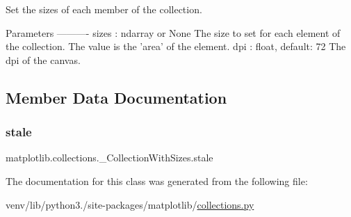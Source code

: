\begin{DoxyVerb}Set the sizes of each member of the collection.

Parameters
----------
sizes : ndarray or None
    The size to set for each element of the collection.  The
    value is the 'area' of the element.
dpi : float, default: 72
    The dpi of the canvas.
\end{DoxyVerb}
 

\subsection{Member Data Documentation}
\mbox{\label{classmatplotlib_1_1collections_1_1__CollectionWithSizes_acf59e05783a5ebb605d18256e92bb4f5}} 
\subsubsection{\texorpdfstring{stale}{stale}}
{\footnotesize\ttfamily matplotlib.\+collections.\+\_\+\+Collection\+With\+Sizes.\+stale}



The documentation for this class was generated from the following file\+:\begin{DoxyCompactItemize}
\item 
venv/lib/python3./site-\/packages/matplotlib/\hyperlink{collections_8py}{collections.\+py}\end{DoxyCompactItemize}
